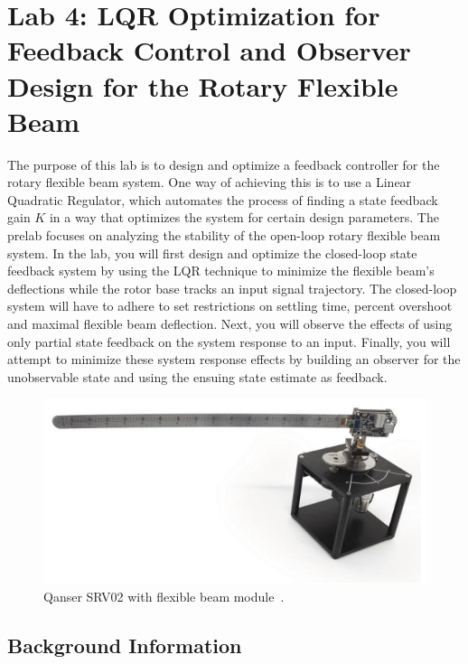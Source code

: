 \chapter{Lab 4: LQR Optimization for Feedback Control and Observer Design for the Rotary Flexible Beam}

The purpose of this lab is to design and optimize a feedback controller for the rotary flexible beam system. One way of achieving this is to use a Linear Quadratic Regulator, which automates the process of finding a state feedback gain $K$ in a way that optimizes the system for certain design parameters. The prelab focuses on analyzing the stability of the open-loop rotary flexible beam system. In the lab, you will first design and optimize the closed-loop state feedback system by using the LQR technique to minimize the flexible beam's deflections while the rotor base tracks an input signal trajectory. The closed-loop system will have to adhere to set restrictions on settling time, percent overshoot and maximal flexible beam deflection. Next, you will observe the effects of using only partial state feedback on the system response to an input. Finally, you will attempt to minimize these system response effects by building an observer for the unobservable state and using the ensuing state estimate as feedback.
\begin{figure}[htb!]
    \centering
    \includegraphics[width=.6\linewidth]{eps/lab_1/quanser.eps}
    \caption{Qanser SRV02 with flexible beam module~\cite{Q-Flex-Beam}.}
    \label{fig:lab4_plant}
\end{figure}

\section{Background Information}
